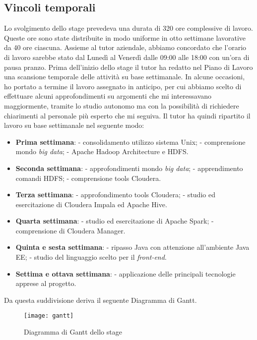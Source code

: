 \subsection{Vincoli temporali} \label{pdl}
Lo svolgimento dello stage prevedeva una durata di 320 ore complessive di lavoro. Queste ore sono state distribuite in modo uniforme in otto settimane lavorative da 40 ore ciascuna. Assieme al tutor aziendale, abbiamo concordato che l'orario di lavoro sarebbe stato dal Lunedì al Venerdì dalle 09:00 alle 18:00 con un'ora di pausa pranzo. Prima dell'inizio dello stage il tutor ha redatto nel Piano di Lavoro una scansione temporale delle attività su base settimanale.
In alcune occasioni, ho portato a termine il lavoro assegnato in anticipo, per cui abbiamo scelto di effettuare alcuni approfondimenti su argomenti che mi interessavano maggiormente, tramite lo studio autonomo ma con la possibilità di richiedere chiarimenti al personale più esperto che mi seguiva.
Il tutor ha quindi ripartito il lavoro su base settimanale nel seguente modo:
\begin{itemize}
	\item \textbf{Prima settimana}: 
		\subitem - consolidamento utilizzo sistema Unix;
		\subitem - comprensione mondo \textit{big data};
		\subitem - Apache Hadoop Architecture e \gls{HDFS}.
	\item \textbf{Seconda settimana}:
		\subitem - approfondimenti mondo \textit{big data};
		\subitem - apprendimento comandi \gls{HDFS};
		\subitem - comprensione tools Cloudera.
	\item \textbf{Terza settimana}:
		\subitem - approfondimento tools Cloudera;
		\subitem - studio ed esercitazione di Cloudera Impala ed Apache Hive.
	\item \textbf{Quarta settimana}:
		\subitem - studio ed esercitazione di Apache Spark;
		\subitem - comprensione di Cloudera Manager.
	\item \textbf{Quinta e sesta settimana}:
	 	\subitem - ripasso Java con attenzione all'ambiente Java EE;
	 	\subitem - studio del linguaggio scelto per il \textit{front-end}.
	\item \textbf{Settima e ottava settimana}:
		\subitem - applicazione delle principali tecnologie apprese al progetto.
\end{itemize}
Da questa suddivisione deriva il seguente \gls{Diagramma di Gantt}.
\begin{figure}[!h] 
	\centering 
	\texttt{[image: gantt]}
	\caption{Diagramma di Gantt dello stage}
\end{figure}

